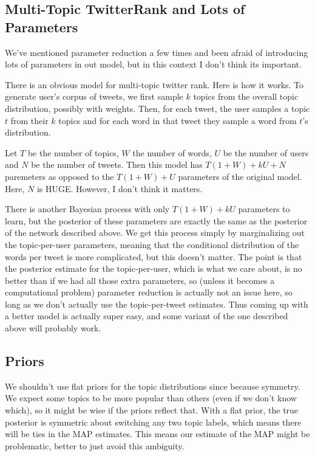 \subsection*{Multi-Topic TwitterRank and Lots of Parameters}

We've mentioned parameter reduction a few times and been afraid of introducing lots of parameters in out model, but in this context I don't think its important.  

There is an obvious model for multi-topic twitter rank.  Here is how it works.
To generate user's corpus of tweets, we first sample $k$ topics from the overall topic distribution, possibly with weights.  
Then, for each tweet, the user samples a topic $t$ from their $k$ topics and for each word in that tweet they sample a word from $t$'s distribution.

Let $T$ be the number of topics, $W$ the number of words, $U$ be the number of users and $N$ be the number of tweets.
Then this model has $T(1+W) + kU + N$ paremeters as opposed to the $T(1+W) + U$ parameters of the original model.
Here, $N$ is HUGE.  However, I don't think it matters.

There is another Bayesian process with only $T(1+W) + kU$ parameters to learn, but the posterior of these parameters are exactly the same as the posterior of the network described above.  We get this process simply by marginalizing out the topic-per-user parameters, meaning that the conditional distribution of the words per tweet is more complicated, but this doesn't matter.
The point is that the posterior estimate for the topic-per-user, which is what we care about, is no better than if we had all those extra parameters, so (unless it becomes a computational problem) parameter reduction is actually not an issue here, so long as we don't actually use the topic-per-tweet estimates.  Thus coming up with a better model is actually super easy, and some variant of the one described above will probably work.  

\subsection*{Priors}

We shouldn't use flat priors for the topic distributions since because symmetry.
We expect some topics to be more popular than others (even if we don't know which), so it might be wise if the priors reflect that.
With a flat prior, the true posterior is symmetric about switching any two topic labels, which means there will be ties in the MAP estimates.
This means our estimate of the MAP might be problematic, better to just avoid this ambiguity.  
